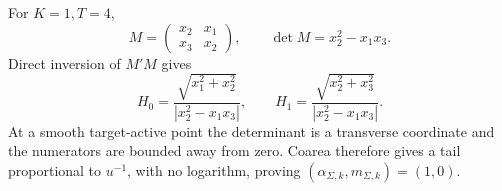 For \(K=1,T=4\),
\[
M=\begin{pmatrix}x_2&x_1\\x_3&x_2\end{pmatrix},
\qquad \det M=x_2^2-x_1x_3.
\]
Direct inversion of \(M'M\) gives
\[
H_0=\frac{\sqrt{x_1^2+x_2^2}}{|x_2^2-x_1x_3|},
\qquad
H_1=\frac{\sqrt{x_2^2+x_3^2}}{|x_2^2-x_1x_3|}.
\]
At a smooth target-active point the determinant is a transverse coordinate and the numerators are bounded away from zero. Coarea therefore gives a tail proportional to \(u^{-1}\), with no logarithm, proving \((\alpha_{\Sigma,k},m_{\Sigma,k})=(1,0)\).